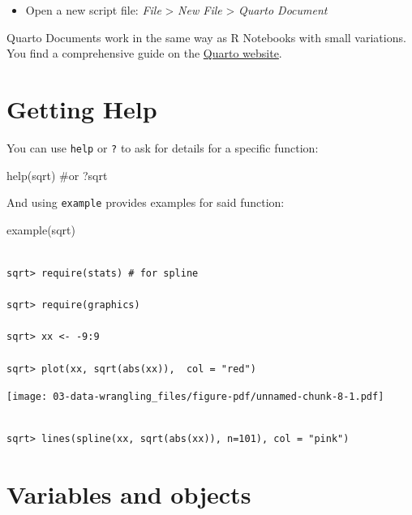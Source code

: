 \documentclass[
  letterpaper,
  DIV=11,
  numbers=noendperiod,
  oneside]{scrreprt}
\newenvironment{Shaded}{\begin{snugshade}}{\end{snugshade}}
\newcommand{\CommentTok}[1]{\textcolor[rgb]{0.37,0.37,0.37}{#1}}
\newcommand{\FunctionTok}[1]{\textcolor[rgb]{0.28,0.35,0.67}{#1}}
\newcommand{\NormalTok}[1]{\textcolor[rgb]{0.00,0.23,0.31}{#1}}
\providecommand{\tightlist}{%
  \setlength{\itemsep}{0pt}\setlength{\parskip}{0pt}}\usepackage{longtable,booktabs,array}
\begin{document}
\begin{itemize}
\tightlist
\item
  Open a new script file: \emph{File} \textgreater{} \emph{New File}
  \textgreater{} \emph{Quarto Document}
\end{itemize}

Quarto Documents work in the same way as R Notebooks with small
variations. You find a comprehensive guide on the
\href{https://quarto.org/docs/guide/}{Quarto website}.

\section{Getting Help}\label{getting-help}

You can use \texttt{help} or \texttt{?} to ask for details for a
specific function:

\begin{Shaded}
\begin{Highlighting}[]
\FunctionTok{help}\NormalTok{(sqrt) }\CommentTok{\#or}
\NormalTok{?sqrt}
\end{Highlighting}
\end{Shaded}

And using \texttt{example} provides examples for said function:

\begin{Shaded}
\begin{Highlighting}[]
\FunctionTok{example}\NormalTok{(sqrt)}
\end{Highlighting}
\end{Shaded}

\begin{verbatim}

sqrt> require(stats) # for spline

sqrt> require(graphics)

sqrt> xx <- -9:9

sqrt> plot(xx, sqrt(abs(xx)),  col = "red")
\end{verbatim}

\texttt{[image: 03-data-wrangling\_files/figure-pdf/unnamed-chunk-8-1.pdf]}

\begin{verbatim}

sqrt> lines(spline(xx, sqrt(abs(xx)), n=101), col = "pink")
\end{verbatim}

\section{Variables and objects}\label{variables-and-objects}
\end{document}

